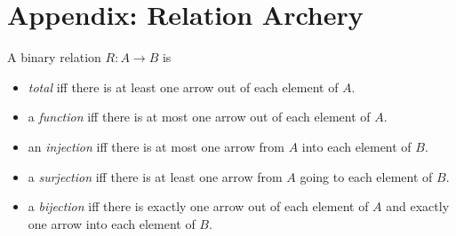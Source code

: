 \documentclass[handout]{mcs}
\begin{document}


\section*{Appendix: Relation Archery}

A binary relation $R:A \to B$ is
\begin{itemize}

\item \emph{total} iff there is at least one arrow out of each element of $A$.

\iffalse
Formally, $\forall a \in A\, \exists  b \in B.\ a\mrel{R}b$.
\fi

\item a \emph{function} iff there is at most one arrow out of each element of
  $A$.

\iffalse
Formally, $\forall a \in A\, \forall b,c \in B.\ [ a\mrel{R}b
  \QAND a\mrel{R}c] \QIMPLIES b=c$.
\fi

\item an \emph{injection} iff there is at most one arrow from $A$ into
  each element of $B$.

\iffalse
  Formally, $\forall a,a' \in A\, \forall b \in
  B.[\ a \mrel{R} b \QAND a' \mrel{R} b] \QIMPLIES a=a'$.
\fi

\item a \emph{surjection} iff there is at least one arrow from $A$ going
  to each element of $B$.

\iffalse
Formally, $\forall b \in B\, \exists a \in
  A.\ a\mrel{R}b$.
\fi

\item a \emph{bijection} iff there is exactly one arrow out of each
element of $A$ and exactly one arrow into each element of $B$.
\end{itemize}
\end{document}
